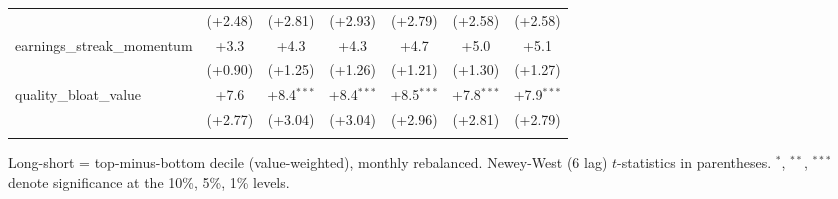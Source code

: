 \begin{table}[htbp]
\begin{threeparttable}
\begin{tabular}{lcccccc}
 & (+2.48) & (+2.81) & (+2.93) & (+2.79) & (+2.58) & (+2.58) \\
\addlinespace
earnings\_streak\_momentum & +3.3 & +4.3 & +4.3 & +4.7 & +5.0 & +5.1 \\
 & (+0.90) & (+1.25) & (+1.26) & (+1.21) & (+1.30) & (+1.27) \\
\addlinespace
quality\_bloat\_value & +7.6 & +8.4$^{***}$ & +8.4$^{***}$ & +8.5$^{***}$ & +7.8$^{***}$ & +7.9$^{***}$ \\
 & (+2.77) & (+3.04) & (+3.04) & (+2.96) & (+2.81) & (+2.79) \\
\addlinespace
\bottomrule
\end{tabular}
\begin{tablenotes}\footnotesize
\item Long-short = top-minus-bottom decile (value-weighted), monthly rebalanced. Newey-West (6 lag) $t$-statistics in parentheses. $^{*}$, $^{**}$, $^{***}$ denote significance at the 10\%, 5\%, 1\% levels.
\end{tablenotes}
\end{threeparttable}
\end{table}